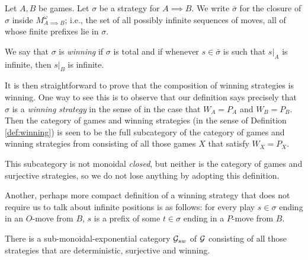 \documentclass{article}
\begin{document}
\begin{definition}
  \label{def:winning}
  Let $A,B$ be games.  
  Let $\sigma$ be a strategy for $A\implies B$.  
  We write $\bar\sigma$ for the closure of $\sigma$ inside $M_{A\implies B}^{\omega}$; i.e., the set of all possibly infinite sequences of moves, all of whose finite prefixes lie in $\sigma$.  

  We say that $\sigma$ is \emph{winning} if $\sigma$ is total and if whenever $s\in\bar\sigma$ is such that $s\vert_A$ is infinite, then $s\vert_B$ is infinite.  
\end{definition}

\begin{remark}
  It is then straightforward to prove that the composition of winning strategies is winning.  
  One way to see this is to observe that our definition says precisely that $\sigma$ is a \emph{winning strategy} in the sense of \cite{abramskyjagadeesangames} in the case that $W_A=P_A$ and $W_B=P_B$.  Then the category of games and winning strategies (in the sense of Definition \ref{def:winning}) is seen to be the full subcategory of the category of games and winning strategies from \cite{abramskyjagadeesangames} consisting of all those games $X$ that satisfy $W_X=P_X$.  

  This subcategory is not monoidal \emph{closed}, but neither is the category of games and surjective strategies, so we do not lose anything by adopting this definition.
\end{remark}

\begin{remark}
  Another, perhaps more compact definition of a winning strategy that does not require us to talk about infinite positions is as follows: for every play $s\in\sigma$ ending in an $O$-move from $B$, $s$ is a prefix of some $t\in\sigma$ ending in a $P$-move from $B$.
\end{remark}

\begin{proposition}
  There is a sub-monoidal-exponential category $\mathcal G_{sw}$ of $\mathcal G$ consisting of all those strategies that are deterministic, surjective and winning.
\end{proposition}
\end{document}
